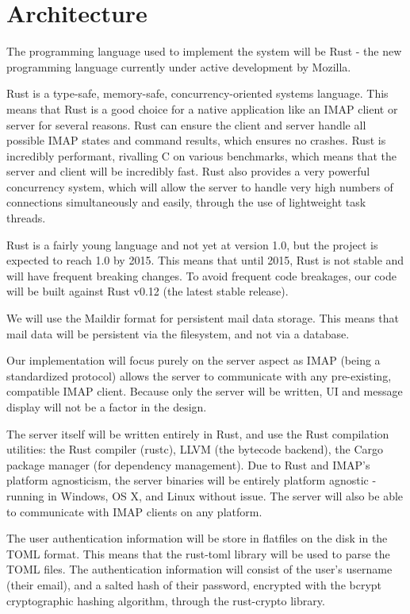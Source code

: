 \documentclass[a4paper,12pt]{article}
\begin{document}
\section*{Architecture}

The programming language used to implement the system will be Rust - the new programming language currently under active development by Mozilla.

Rust is a type-safe, memory-safe, concurrency-oriented systems language.
This means that Rust is a good choice for a native application like an IMAP client or server for several reasons.
Rust can ensure the client and server handle all possible IMAP states and command results, which ensures no crashes.
Rust is incredibly performant, rivalling C on various benchmarks, which means that the server and client will be incredibly fast.
Rust also provides a very powerful concurrency system, which will allow the server to handle very high numbers of connections simultaneously and easily, through the use of lightweight task threads.

Rust is a fairly young language and not yet at version 1.0, but the project is expected to reach 1.0 by 2015.
This means that until 2015, Rust is not stable and will have frequent breaking changes.
To avoid frequent code breakages, our code will be built against Rust v0.12 (the latest stable release).

We will use the Maildir format for persistent mail data storage.
This means that mail data will be persistent via the filesystem, and not via a database.

Our implementation will focus purely on the server aspect as IMAP (being a standardized protocol) allows the server to communicate with any pre-existing, compatible IMAP client.
Because only the server will be written, UI and message display will not be a factor in the design.

The server itself will be written entirely in Rust, and use the Rust compilation utilities: the Rust compiler (rustc), LLVM (the bytecode backend), the Cargo package manager (for dependency management).
Due to Rust and IMAP's platform agnosticism, the server binaries will be entirely platform agnostic - running in Windows, OS X, and Linux without issue.
The server will also be able to communicate with IMAP clients on any platform.

The user authentication information will be store in flatfiles on the disk in the TOML format.
This means that the rust-toml library will be used to parse the TOML files.
The authentication information will consist of the user's username (their email), and a salted hash of their password, encrypted with the bcrypt cryptographic hashing algorithm, through the rust-crypto library.
\end{document}
